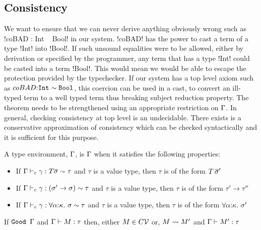 \documentclass[screen,nonacm,manuscript,review]{acmart} %
\begin{document}
\subsection{Consistency}
We want to ensure that we can never derive anything obviously
wrong such as !coBAD : Int ~ Bool! in our system.
!coBAD! has the power to cast a term of a type !Int! into !Bool!. If
such unsound equalities were to be allowed, either by derivation or
specified by the programmer, any term that has a type !Int! could be
casted into a term !Bool!. This would mean we would be able to escape
the protection provided by the typechecker. If our system has a top
level axiom such as $coBAD {:} \texttt{Int} \sim \texttt{Bool}$, this
coercion can be used in a cast, to convert an ill-typed term to a well
typed term thus breaking subject reduction property. The theorem needs
to be strengthened using an appropriate restriction on $\TEnv$. In
general, checking consistency at top level is an undecidable. There
exists is a conservative approximation of consistency which can be
checked syntactically and it is sufficient for this purpose.


\begin{definition}[\Good $\TEnv$]
 A type environment, $\TEnv$, is \Good $\TEnv$ when it satisfies the
 following properties:
 \begin{itemize}
 \item If $\Gamma \vdash_{c} \gamma : T \overline{\sigma} \sim \tau$ and $\tau$
   is a value type, then $\tau$ is of the form $T\,\overline{\sigma}'$
 \item If $\Gamma \vdash_{c} \gamma : (\sigma' \to \sigma) \sim \tau$ and
   $\tau$ is a value type, then $\tau$ is of the form $\tau' \to \tau''$
 \item If $\Gamma \vdash_{c} \gamma : \forall\alpha{:}\kappa.~\sigma \sim
     \tau$ and $\tau$ is a value type, then $\tau$ is of the form
   $\forall\alpha{:}\kappa.~\sigma'$
 \end{itemize}
\end{definition}

\begin{theorem}\label{thm:progress-sfc}
 If $\texttt{Good~}\Gamma$ and $\Gamma \vdash M : \tau$ then, either $M \in
 C\mathcal{V}$ or, $M \rightsquigarrow M'$ and $\Gamma \vdash M' : \tau$
\end{theorem}
\end{document}
